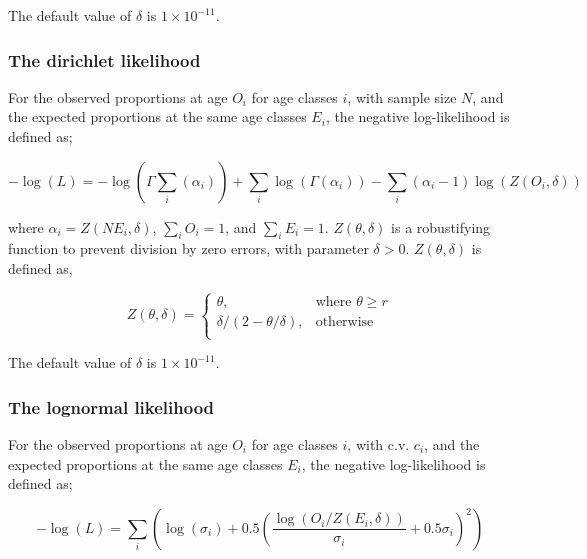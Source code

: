 {{{{The default value of $\delta$ is $1 \times 10^{-11}$.
\subsubsection*{The dirichlet likelihood}

For the observed proportions at age $O_i$ for age classes $i$, with sample size $N$, and the expected proportions at the same age classes $E_i$, the negative log-likelihood is defined as; 

\begin{equation}
-\log \left(L \right) = -\log(\Gamma \sum\limits_i (\alpha_i)) + \sum\limits_i \log(\Gamma (\alpha_i)) - \sum\limits_i (\alpha_i-1) \log(Z(O_i,\delta))
\end{equation}

where $\alpha_i = Z \left(N E_i,\delta \right)$, $\sum\limits_i O_i = 1$, and $\sum\limits_i E_i = 1$. $Z \left(\theta,\delta \right)$ is a robustifying function to prevent division by zero errors, with parameter $\delta>0$. $Z \left(\theta,\delta \right)$ is defined as,

\begin{equation}
Z \left(\theta,\delta \right) = \begin{cases}
\theta, & \text{where $\theta \ge r$} \\
\delta/\left( 2-\theta/\delta \right), & \text{otherwise} \\  
\end{cases}
\end{equation}

The default value of $\delta$ is $1 \times 10^{-11}$.

\subsubsection*{The lognormal likelihood}

For the observed proportions at age $O_i$ for age classes $i$, with c.v. $c_i$, and the expected proportions at the same age classes $E_i$, the negative log-likelihood is defined as; 

\begin{equation}
 - \log \left(L \right) = \sum\limits_i \left( \log \left( \sigma _i \right) + 0.5\left( \frac{\log \left(O_i / Z \left(E_i,\delta \right) \right)}{\sigma_i} + 0.5 \sigma_i \right)^2 \right)
\end{equation}

}}}}
